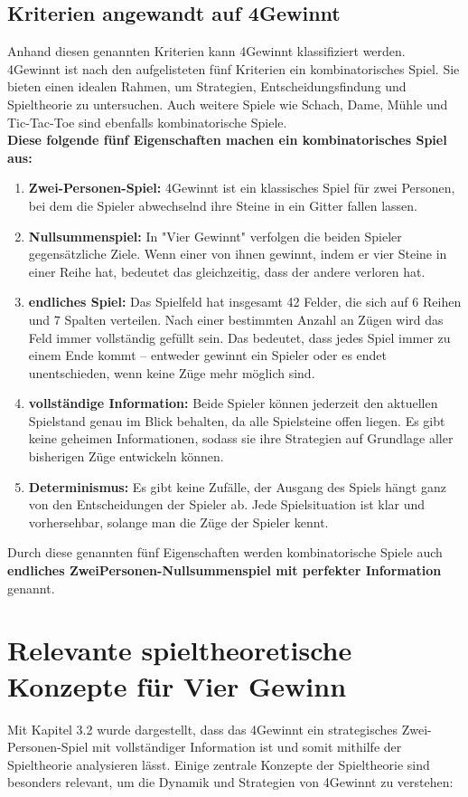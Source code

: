 \subsection*{Kriterien angewandt auf 4Gewinnt}
Anhand diesen genannten Kriterien kann 4Gewinnt klassifiziert werden. 4Gewinnt ist nach den aufgelisteten fünf Kriterien ein kombinatorisches Spiel. Sie bieten einen idealen Rahmen, um Strategien, Entscheidungsfindung und Spieltheorie zu untersuchen. Auch weitere Spiele wie Schach, Dame, Mühle und Tic-Tac-Toe sind ebenfalls kombinatorische Spiele. \\

\textbf{Diese folgende fünf Eigenschaften machen ein kombinatorisches Spiel aus:}
\begin{enumerate}
	\item   \textbf{Zwei-Personen-Spiel: }4Gewinnt ist ein klassisches Spiel für zwei Personen, bei dem die Spieler abwechselnd ihre Steine in ein Gitter fallen lassen. 
	\item 	\textbf{Nullsummenspiel: }In "Vier Gewinnt" verfolgen die beiden Spieler gegensätzliche Ziele. Wenn einer von ihnen gewinnt, indem er vier Steine in einer Reihe hat, bedeutet das gleichzeitig, dass der andere verloren hat.
	\item 	\textbf{endliches Spiel: } Das Spielfeld hat insgesamt 42 Felder, die sich auf 6 Reihen und 7 Spalten verteilen. Nach einer bestimmten Anzahl an Zügen wird das Feld immer vollständig gefüllt sein. Das bedeutet, dass jedes Spiel immer zu einem Ende kommt – entweder gewinnt ein Spieler oder es endet unentschieden, wenn keine Züge mehr möglich sind.
	\item 	\textbf{vollständige Information: } Beide Spieler können jederzeit den aktuellen Spielstand genau im Blick behalten, da alle Spielsteine offen liegen. Es gibt keine geheimen Informationen, sodass sie ihre Strategien auf Grundlage aller bisherigen Züge entwickeln können.
	\item 	\textbf{Determinismus:} Es gibt keine Zufälle, der Ausgang des Spiels hängt ganz von den Entscheidungen der Spieler ab. Jede Spielsituation ist klar und vorhersehbar, solange man die Züge der Spieler kennt.
\end{enumerate}

Durch diese genannten fünf Eigenschaften werden kombinatorische Spiele auch \textbf{endliches ZweiPersonen-Nullsummenspiel mit perfekter Information} genannt\autocite{holler_einfuhrung_2019}.

\section{Relevante spieltheoretische Konzepte für Vier Gewinn}
Mit Kapitel 3.2 wurde dargestellt, dass das 4Gewinnt ein strategisches Zwei-Personen-Spiel mit vollständiger Information ist und somit mithilfe der Spieltheorie analysieren lässt. Einige zentrale Konzepte der Spieltheorie sind besonders relevant, um die Dynamik und Strategien von 4Gewinnt zu verstehen:



